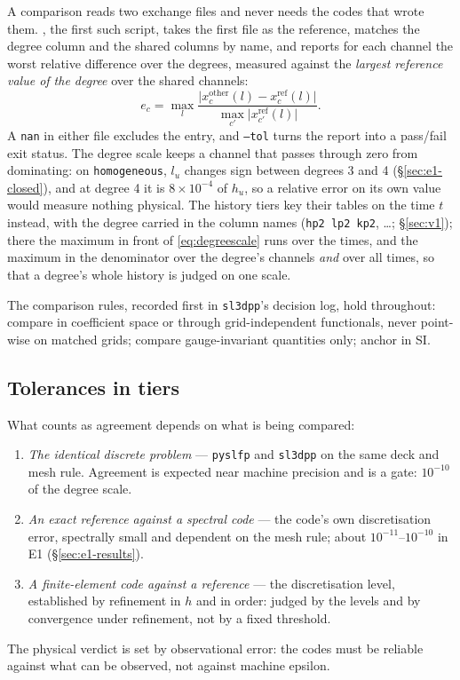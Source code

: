 \documentclass[11pt]{article}
\numberwithin{equation}{section}
\newcommand{\code}[1]{\texttt{#1}}
\begin{document}
A comparison reads two exchange files and never needs the codes that wrote
them. , the first such script,
takes the first file as the reference, matches the degree column and the
shared columns by name, and reports for each channel the worst relative
difference over the degrees, measured against the \emph{largest reference
value of the degree} over the shared channels:
\begin{equation}
  e_c = \max_l
  \frac{\bigl|x_c^{\text{other}}(l)-x_c^{\text{ref}}(l)\bigr|}
       {\max_{c'}\bigl|x_{c'}^{\text{ref}}(l)\bigr|} .
  \label{eq:degreescale}
\end{equation}
A \code{nan} in either file excludes the entry, and \code{--tol} turns the
report into a pass/fail exit status. The degree scale keeps a channel that
passes through zero from dominating: on \code{homogeneous}, $l_u$ changes
sign between degrees 3 and 4 (\S\ref{sec:e1-closed}), and at degree 4 it is
$8\times10^{-4}$ of $h_u$, so a relative error on its own value would
measure nothing physical. The history tiers key their tables on the time
$t$ instead, with the degree carried in the column names (\code{hp2 lp2
kp2}, \dots; \S\ref{sec:v1}); there the maximum in front of
\eqref{eq:degreescale} runs over the times, and the maximum in the
denominator over the degree's channels \emph{and} over all times, so that a
degree's whole history is judged on one scale.

The comparison rules, recorded first in \code{sl3dpp}'s decision log, hold
throughout: compare in coefficient space or through grid-independent
functionals, never point-wise on matched grids; compare gauge-invariant
quantities only; anchor in SI.

\subsection{Tolerances in tiers}
\label{sec:tolerances}

What counts as agreement depends on what is being compared:
\begin{enumerate}[leftmargin=*,label=(\roman*)]
\item \emph{The identical discrete problem} --- \code{pyslfp} and
  \code{sl3dpp} on the same deck and mesh rule. Agreement is expected near
  machine precision and is a gate: $10^{-10}$ of the degree scale.
\item \emph{An exact reference against a spectral code} --- the code's own
  discretisation error, spectrally small and dependent on the mesh rule;
  about $10^{-11}$--$10^{-10}$ in E1 (\S\ref{sec:e1-results}).
\item \emph{A finite-element code against a reference} --- the
  discretisation level, established by refinement in $h$ and in order:
  judged by the levels and by convergence under refinement, not by a fixed
  threshold.
\end{enumerate}
The physical verdict is set by observational error: the codes must be
reliable against what can be observed, not against machine epsilon.
\end{document}

